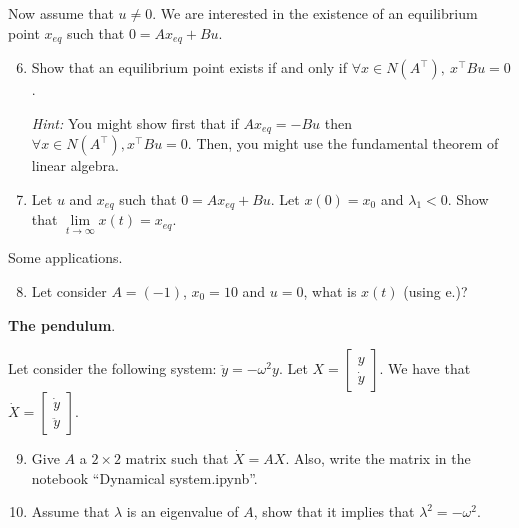 Now assume that $u\neq 0$. We are interested in the existence of an equilibrium point $x_{eq}$ such that $0 = Ax_{eq} + Bu$.

\begin{enumerate}
\setcounter{enumi}{5}
\item Show that an equilibrium point exists if and only if $\forall x\in N(A^\top),\ x^\top Bu = 0$.

\textit{Hint:} You might show first that if $Ax_{eq}=-Bu$ then $\forall x \in N(A^\top), x^\top Bu=0$. Then, you might use the fundamental theorem of linear algebra.

\sol{}
\item Let $u$ and $x_{eq}$ such that $0 = Ax_{eq} + Bu$. Let $x(0) = x_0$ and $\lambda_1<0$. Show that $\lim\limits_{t\rightarrow\infty}x(t) = x_{eq}$.

\sol{}
\end{enumerate}

Some applications. 
\begin{enumerate}
\setcounter{enumi}{7}
\item Let consider $A=(-1)$, $x_0 = 10$ and $u=0$, what is $x(t)$ (using e.)?

\sol{}
\end{enumerate}

\textbf{The pendulum}.

Let consider the following system: $\ddot{y} = -\omega^2 y $. 
Let $X = \begin{bmatrix}
    y \\ \dot{y}
\end{bmatrix}$.
We have that 
$\dot{X} = \begin{bmatrix}
    \dot{y} \\ \ddot{y}
\end{bmatrix}$.
\begin{enumerate}
\setcounter{enumi}{8}
\item Give $A$ a $2\times 2$ matrix such that $\dot{X} = A X$.
Also, write the matrix in the notebook ``Dynamical system.ipynb''.

\sol{}
\item Assume that $\lambda$ is an eigenvalue of $A$, show that it implies that $\lambda^2=-\omega^2$.

\sol{}
\end{enumerate}

